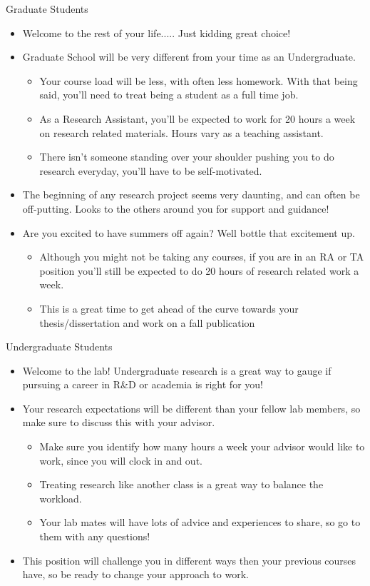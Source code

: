 \documentclass[handout]{beamer}
\begin{document}
\begin{frame}{Graduate Students}
\begin{itemize}
  \item Welcome to the rest of your life..... Just kidding great choice!
  \item Graduate School will be very different from your time as an Undergraduate.
  \begin{itemize}
      \item Your course load will be less, with often less homework. With that being said, you'll need to treat being a student as a full time job. 
      \item As a Research Assistant, you'll be expected to work for 20 hours a week on research related materials. Hours vary as a teaching assistant.
      \item There isn't someone standing over your shoulder pushing you to do research everyday, you'll have to be self-motivated.
  \end{itemize}
  \item The beginning of any research project seems very daunting, and can often be off-putting. Looks to the others around you for support and guidance!
  \item Are you excited to have summers off again? Well bottle that excitement up.
  \begin{itemize}
      \item Although you might not be taking any courses, if you are in an RA or TA position you'll still be expected to do 20 hours of research related work a week.
      \item This is a great time to get ahead of the curve towards your thesis/dissertation and work on a fall publication
  \end{itemize}
\end{itemize}
\end{frame}

\begin{frame}{Undergraduate Students}
\begin{itemize}
  \item Welcome to the lab! Undergraduate research is a great way to gauge if pursuing a career in R&D or academia is right for you!
  \item Your research expectations will be different than your fellow lab members, so make sure to discuss this with your advisor.
  \begin{itemize}
      \item Make sure you identify how many hours a week your advisor would like to work, since you will clock in and out. 
      \item Treating research like another class is a great way to balance the workload.
      \item Your lab mates will have lots of advice and experiences to share, so go to them with any questions!
  \end{itemize}
  \item This position will challenge you in different ways then your previous courses have, so be ready to change your approach to work.
\end{itemize}
\end{frame}
\end{document}
